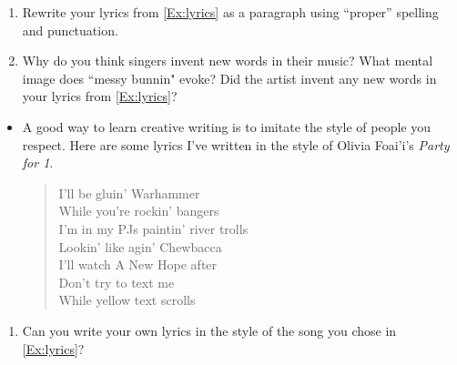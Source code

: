 \documentclass[12pt]{article}
\newcounter{exercisenum}
\newenvironment{exercises}{%
  \begin{tcolorbox}[colback=white,colframe=black,arc=0pt,breakable]
  \begin{enumerate}[label=\arabic*),leftmargin=1cm,resume=exercises]
  \setcounter{enumi}{\value{exercisenum}}
}{%
  \setcounter{exercisenum}{\value{enumi}}
  \end{enumerate}
  \end{tcolorbox}
}
\begin{document}
\begin{exercises}
\item
Rewrite your lyrics from \ref{Ex:lyrics} as a paragraph using ``proper'' spelling and punctuation.
\item
Why do you think singers invent new words in their music? What mental image does ``messy bunnin" evoke? Did the artist invent any new words in your lyrics from \ref{Ex:lyrics}?
\end{exercises}

\begin{itemize}
\item
A good way to learn creative writing is to imitate the style of people you respect. Here are some lyrics I've written in the style of Olivia Foai'i's \textit{Party for 1}.
\begin{quotation}
\noindent I'll be gluin' Warhammer \\
While you're rockin' bangers \\
I'm in my PJs paintin' river trolls \\
Lookin' like agin' Chewbacca \\
I'll watch A New Hope after \\
Don't try to text me \\
While yellow text scrolls
\end{quotation}
\end{itemize}

\begin{exercises}
\item
Can you write your own lyrics in the style of the song you chose in \ref{Ex:lyrics}?
\end{exercises}
\end{document}
